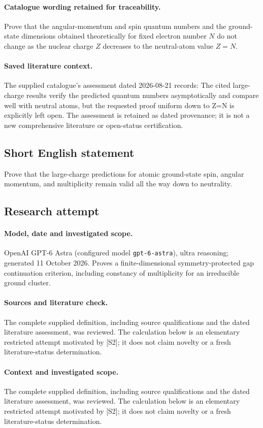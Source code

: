 \documentclass[11pt]{article}
\begin{document}
\paragraph{Catalogue wording retained for traceability.}
Prove that the angular-momentum and spin quantum numbers and the ground-state dimensions obtained theoretically for fixed electron number $N$ do not change as the nuclear charge $Z$ decreases to the neutral-atom value $Z=N$.

\paragraph{Saved literature context.} The supplied catalogue's assessment dated 2026-08-21 records: The cited large-charge results verify the predicted quantum numbers asymptotically and compare well with neutral atoms, but the requested proof uniform down to Z=N is explicitly left open. The assessment is retained as dated provenance; it is not a new comprehensive literature or open-status certification.
\subsection{Short English statement}
Prove that the large-charge predictions for atomic ground-state spin, angular momentum, and multiplicity remain valid all the way down to neutrality.
\subsection{Research attempt}
\paragraph{Model, date and investigated scope.}
OpenAI GPT-6 Astra (configured model \texttt{gpt-6-astra}), ultra reasoning; generated 11 October 2026. Proves a finite-dimensional symmetry-protected gap continuation criterion, including constancy of multiplicity for an irreducible ground cluster.

\paragraph{Sources and literature check.}
The complete supplied definition, including source qualifications and the dated literature assessment, was reviewed. The calculation below is an elementary restricted attempt motivated by [S2]; it does not claim novelty or a fresh literature-status determination.

\paragraph{Context and investigated scope.} The complete supplied definition, including source qualifications and the dated literature assessment, was reviewed. The calculation below is an elementary restricted attempt motivated by [S2]; it does not claim novelty or a fresh literature-status determination.
\end{document}
